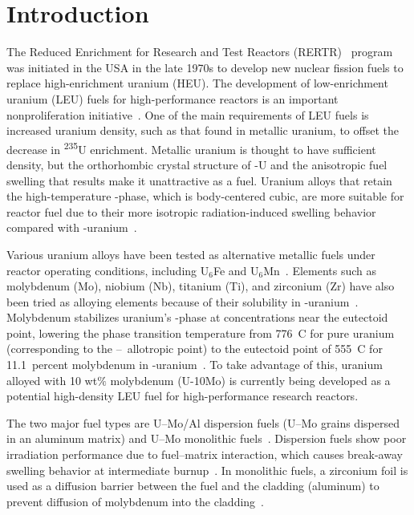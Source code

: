 
\section{Introduction}\label{sec:introduction}
The Reduced Enrichment for Research and Test Reactors (RERTR)~\cite{snelgrove1997development} program was initiated in the USA in the late 1970s to develop new nuclear fission fuels to replace high-enrichment uranium (HEU)\@. The development of low-enrichment uranium (LEU) fuels for high-performance reactors is an important nonproliferation initiative~\cite{snelgrove1997development}. One of the main requirements of LEU fuels is increased uranium density, such as that found in metallic uranium, to offset the decrease in \textsuperscript{235}U enrichment. Metallic uranium is thought to have sufficient density, but the orthorhombic crystal structure of \textalpha-U
and the anisotropic fuel swelling that results make it unattractive as a fuel.
Uranium alloys that retain the high-temperature \textgamma-phase, which is body-centered cubic, are more suitable for reactor fuel due to their more isotropic radiation-induced swelling behavior compared with  \textalpha-uranium~\cite{kittel1993history}.

Various uranium alloys have been tested as alternative metallic fuels under reactor operating conditions, including U$_6$Fe and U$_6$Mn~\cite{meyer2000irradiation,hofman1987irradiation}.
Elements such as molybdenum (Mo), niobium (Nb), titanium (Ti), and zirconium (Zr) have also been tried as alloying elements because of their solubility in \textgamma-uranium~\cite{donze1959stabilisation,giraud1973formation,lopes2013mechanical}. Molybdenum stabilizes uranium's \textgamma-phase at concentrations near the eutectoid point, lowering the phase transition temperature from 776~\textdegree C for pure uranium (corresponding to the \textbeta--\textgamma\ allotropic point) to the eutectoid point of 555~\textdegree C for 11.1~percent molybdenum in \textgamma-uranium~\cite{ASTM-Alloy-Mo,Berche2011}. To take advantage of this, uranium alloyed with 10 wt$\%$ molybdenum (U-10Mo) is currently being developed as a potential high-density LEU fuel for high-performance research reactors.

The two major fuel types are U--Mo/Al dispersion fuels (U--Mo grains dispersed in an aluminum matrix) and U--Mo monolithic fuels~\cite{keiser2012effects}. Dispersion fuels show poor irradiation performance due to fuel--matrix interaction, which causes break-away swelling behavior at intermediate burnup~\cite{hofman2004post,van2008transmission, leenaers2004post}. In monolithic fuels, a zirconium foil is used as a diffusion barrier between the fuel and the cladding (aluminum) to prevent diffusion of molybdenum into the cladding~\cite{jue2014microstructural}.

